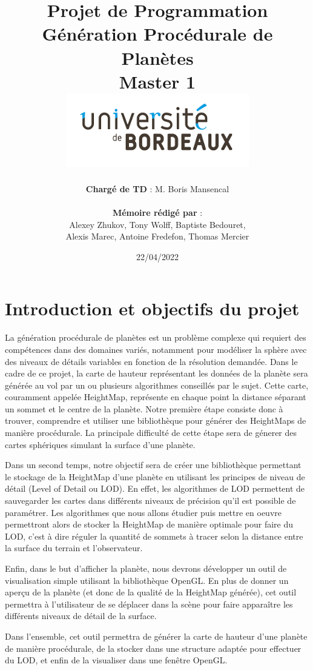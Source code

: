 \documentclass[12pt]{report}
\title{
{\LARGE \textbf{ Projet de Programmation \\ Génération Procédurale de Planètes }}\\
 {\large Master 1 }\\
 {\vspace{10mm}}
 {\includegraphics[width=0.6\textwidth]{images/télécharger.png}}
 }
\author{\textbf{Chargé de TD} : M. Boris Mansencal\\
 \\
 {\vspace{0.3cm}}
 \textbf{Mémoire rédigé par} : \\Alexey Zhukov, Tony Wolff, Baptiste Bedouret, \\Alexis Marec, Antoine Fredefon, Thomas Mercier}
\date{22/04/2022}
\begin{document}
\maketitle
\clearpage


\tableofcontents

\newpage

\chapter{Introduction et objectifs du projet}

La génération procédurale de planètes est un problème complexe qui requiert des compétences dans des domaines variés, notamment pour modéliser la sphère avec des niveaux de détails variables en fonction de la résolution demandée. Dans le cadre de ce projet, la carte de hauteur représentant les données de la planète sera générée au vol par un ou plusieurs algorithmes conseillés par le sujet. Cette carte, couramment appelée HeightMap, représente en chaque point la distance séparant un sommet et le centre de la planète. Notre première étape consiste donc à trouver, comprendre et utiliser une bibliothèque pour générer des HeightMaps de manière procédurale. La principale difficulté de cette étape sera de génerer des cartes sphériques simulant la surface d'une planète.

Dans un second temps, notre objectif sera de créer une bibliothèque permettant le stockage de la HeightMap d'une planète en utilisant les principes de niveau de détail (Level of Detail ou LOD). En effet, les algorithmes de LOD permettent de sauvegarder les cartes dans différents niveaux de précision qu'il est possible de paramétrer. Les algorithmes que nous allons étudier puis mettre en oeuvre permettront alors de stocker la HeightMap de manière optimale pour faire du LOD, c'est à dire réguler la quantité de sommets à tracer selon la distance entre la surface du terrain et l'observateur.

Enfin, dans le but d'afficher la planète, nous devrons développer un outil de visualisation simple utilisant la bibliothèque OpenGL. En plus de donner un aperçu de la planète (et donc de la qualité de la HeightMap générée), cet outil permettra à l'utilisateur de se déplacer dans la scène pour faire apparaître les différents niveaux de détail de la surface.

Dans l'ensemble, cet outil permettra de générer la carte de hauteur d'une planète de manière procédurale, de la stocker dans une structure adaptée pour effectuer du LOD, et enfin de la visualiser dans une fenêtre OpenGL.
\end{document}
